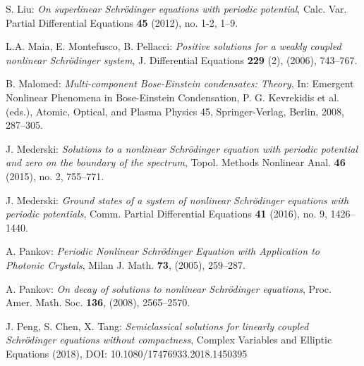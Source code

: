 \documentclass{scrartcl}
\numberwithin{equation}{section}
\begin{document}
\begin{thebibliography}{99}

 S. Liu: {\em On superlinear Schr\"odinger equations with periodic potential}, Calc. Var. Partial Differential Equations \textbf{45} (2012), no. 1-2, 1--9.

 L.A. Maia, E. Montefusco, B. Pellacci: {\em Positive solutions for a weakly coupled nonlinear Schr\"odinger system}, J. Differential Equations \textbf{229} (2), (2006), 743--767.

 B. Malomed: {\em Multi-component Bose-Einstein condensates: Theory}, In: Emergent Nonlinear Phenomena in Bose-Einstein Condensation, P. G. Kevrekidis et al. (eds.), Atomic, Optical, and Plasma Physics 45, Springer-Verlag, Berlin, 2008, 287--305.


 J. Mederski: {\em Solutions to a nonlinear Schr\"odinger equation with periodic potential and zero on the boundary of the spectrum}, Topol. Methods Nonlinear Anal. \textbf{46} (2015), no. 2, 755--771.

 J. Mederski: {\em Ground states of a system of nonlinear Schr\"odinger equations with periodic potentials},  Comm. Partial Differential Equations \textbf{41} (2016), no. 9, 1426--1440.



 A. Pankov: {\em Periodic Nonlinear Schr\"odinger Equation with Application to Photonic Crystals}, Milan J. Math. \textbf{73}, (2005), 259--287.

 A. Pankov: {\em On decay of solutions to nonlinear Schr\"odinger equations},  Proc. Amer. Math. Soc. \textbf{136}, (2008), 2565--2570.


 J. Peng, S. Chen, X. Tang: {\em Semiclassical solutions for linearly coupled Schr\"{o}dinger equations without compactness}, Complex Variables and Elliptic Equations (2018), DOI: 10.1080/17476933.2018.1450395


\end{thebibliography}
\end{document}
